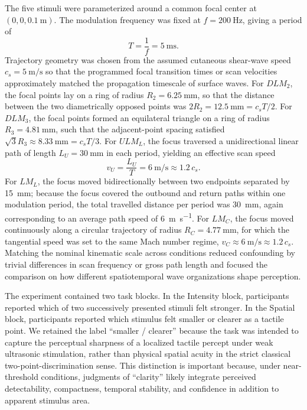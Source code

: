 \documentclass[pdflatex, sn-nature]{sn-jnl}
\theoremstyle{thmstyleone}%
\theoremstyle{thmstyletwo}%
\theoremstyle{thmstylethree}%
\begin{document}
The five stimuli were parameterized around a common focal center at $(0,0,\qty{0.1}{\meter})$. The modulation frequency was fixed at $f=\qty{200}{\hertz}$, giving a period of
\begin{equation}
    T = \frac{1}{f} = \qty{5}{\milli\second} .
\end{equation}
Trajectory geometry was chosen from the assumed cutaneous shear-wave speed $c_s=\qty{5}{\meter\per\second}$ so that the programmed focal transition times or scan velocities approximately matched the propagation timescale of surface waves. For $DLM_2$, the focal points lay on a ring of radius $R_{2}=\qty{6.25}{\milli\meter}$, so that the distance between the two diametrically opposed points was $2R_{2}=\qty{12.5}{\milli\meter}=c_sT/2$. For $DLM_3$, the focal points formed an equilateral triangle on a ring of radius $R_{3}=\qty{4.81}{\milli\meter}$, such that the adjacent-point spacing satisfied $\sqrt{3}R_{3}\approx \qty{8.33}{\milli\meter}=c_sT/3$. For $ULM_L$, the focus traversed a unidirectional linear path of length $L_{U}=\qty{30}{\milli\meter}$ in each period, yielding an effective scan speed
\begin{equation}
    v_U = \frac{L_U}{T} = \qty{6}{\meter\per\second} \approx 1.2\,c_s .
\end{equation}
For $LM_L$, the focus moved bidirectionally between two endpoints separated by \qty{15}{\milli\meter}; because the focus covered the outbound and return paths within one modulation period, the total travelled distance per period was \qty{30}{\milli\meter}, again corresponding to an average path speed of \qty{6}{\meter\per\second}. For $LM_C$, the focus moved continuously along a circular trajectory of radius $R_C=\qty{4.77}{\milli\meter}$, for which the tangential speed was set to the same Mach number regime, $v_C\approx \qty{6}{\meter\per\second} \approx 1.2\,c_s$. Matching the nominal kinematic scale across conditions reduced confounding by trivial differences in scan frequency or gross path length and focused the comparison on how different spatiotemporal wave organizations shape perception.

The experiment contained two task blocks. In the Intensity block, participants reported which of two successively presented stimuli felt stronger. In the Spatial block, participants reported which stimulus felt smaller or clearer as a tactile point. We retained the label ``smaller / clearer'' because the task was intended to capture the perceptual sharpness of a localized tactile percept under weak ultrasonic stimulation, rather than physical spatial acuity in the strict classical two-point-discrimination sense. This distinction is important because, under near-threshold conditions, judgments of ``clarity'' likely integrate perceived detectability, compactness, temporal stability, and confidence in addition to apparent stimulus area.
\end{document}
